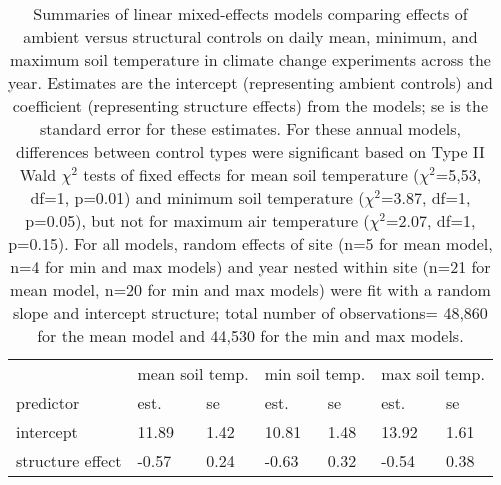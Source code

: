 \documentclass{article}
\begin{document}
\begin{table}[ht]
\centering
\caption{Summaries of linear mixed-effects models comparing effects of ambient versus structural controls on daily mean, minimum, and maximum soil temperature in climate change experiments across the year. Estimates are the intercept (representing ambient controls) and coefficient (representing structure effects) from the models; se is the standard error for these estimates. For these annual models, differences between control types were significant based on Type II Wald $\chi^{2}$ tests of fixed effects for mean soil temperature ($\chi^{2}$=5,53, df=1, p=0.01) and minimum soil temperature ($\chi^{2}$=3.87, df=1, p=0.05), but not for maximum air temperature ($\chi^{2}$=2.07, df=1, p=0.15). For all models, random effects of site (n=5 for mean model, n=4 for min and max models) and year nested within site (n=21 for mean model, n=20 for min and max models) were fit with a random slope and intercept structure; total number of observations= 48,860 for the mean model and 44,530 for the min and max models.} 
\label{table:shamamb_soiltemp}
\begin{tabular}{p{}|p{}p{}|p{}p{}|p{}p{}|}
  \hline
  &\multicolumn{2}{c}{mean soil temp.} &\multicolumn{2}{c}{min soil temp.} &\multicolumn{2}{c}{max soil temp.}\\
 predictor & est. & se & est. & se & est. & se\\
 \hline
intercept & 11.89 & 1.42 & 10.81 & 1.48 & 13.92 & 1.61 \\ 
  structure effect & -0.57 & 0.24 & -0.63 & 0.32 & -0.54 & 0.38 \\ 
   \hline
\end{tabular}
\end{table}
\end{document}
